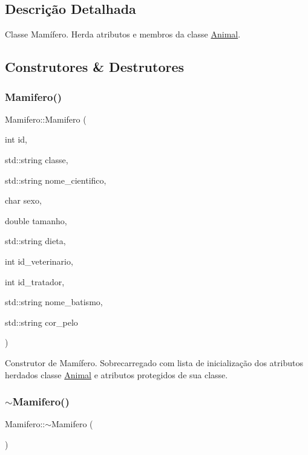 \subsection{Descrição Detalhada}
Classe Mamífero. Herda atributos e membros da classe \hyperlink{classAnimal}{Animal}. 

\subsection{Construtores \& Destrutores}
\mbox{\label{classMamifero_aa27e289fb8db4ba86fa4a5e03a0c7601}} 
\subsubsection{\texorpdfstring{Mamifero()}{Mamifero()}}
{\footnotesize\ttfamily Mamifero\+::\+Mamifero (\begin{DoxyParamCaption}\item[{int}]{id,  }\item[{std\+::string}]{classe,  }\item[{std\+::string}]{nome\+\_\+cientifico,  }\item[{char}]{sexo,  }\item[{double}]{tamanho,  }\item[{std\+::string}]{dieta,  }\item[{int}]{id\+\_\+veterinario,  }\item[{int}]{id\+\_\+tratador,  }\item[{std\+::string}]{nome\+\_\+batismo,  }\item[{std\+::string}]{cor\+\_\+pelo }\end{DoxyParamCaption})}

Construtor de Mamífero. Sobrecarregado com lista de inicialização dos atributos herdados classe \hyperlink{classAnimal}{Animal} e atributos protegidos de sua classe. \mbox{\label{classMamifero_a56eb196d45222e754eb6f19000667d5d}} 
\subsubsection{\texorpdfstring{$\sim$\+Mamifero()}{~Mamifero()}}
{\footnotesize\ttfamily Mamifero\+::$\sim$\+Mamifero (\begin{DoxyParamCaption}{ }\end{DoxyParamCaption})}

